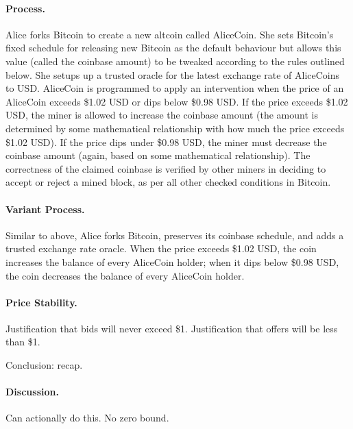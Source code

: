 \paragraph{Process.} Alice forks Bitcoin to create a new altcoin called AliceCoin. She sets Bitcoin's fixed schedule for releasing new Bitcoin as the default behaviour but allows this value (called the coinbase amount) to be tweaked according to the rules outlined below. She setups up a trusted oracle for the latest exchange rate of AliceCoins to USD. AliceCoin is programmed to apply an intervention when the price of an AliceCoin exceeds \$1.02 USD or dips below \$0.98 USD. If the price exceeds \$1.02 USD, the miner is allowed to increase the coinbase amount (the amount is determined by some mathematical relationship with how much the price exceeds \$1.02 USD). If the price dips under \$0.98 USD, the miner must decrease the coinbase amount (again, based on some mathematical relationship). The correctness of the claimed coinbase is verified by other miners in deciding to accept or reject a mined block, as per all other checked conditions in Bitcoin.

\paragraph{Variant Process.} Similar to above, Alice forks Bitcoin, preserves its coinbase schedule, and adds a trusted exchange rate oracle. When the price exceeds \$1.02 USD, the coin increases the balance of every AliceCoin holder; when it dips below \$0.98 USD, the coin decreases the balance of every AliceCoin holder.

\paragraph{Price Stability.} Justification that bids will never exceed \$1. Justification that offers will be less than \$1.

Conclusion: recap.

\paragraph{Discussion.} Can actionally do this. No zero bound.


